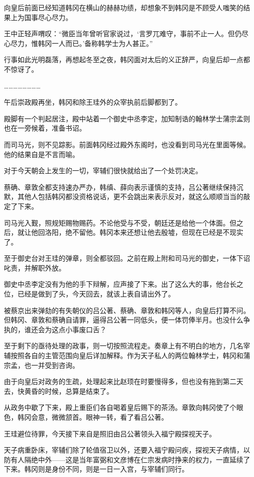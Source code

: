 向皇后前面已经知道韩冈在横山的赫赫功绩，却想象不到韩冈是不顾受人嗤笑的结果上为国事尽心尽力。 

王中正轻声喟叹：“微臣当年曾听官家说过，‘言罗兀难守，事前不止一人。但仍尽心尽力，惟韩冈一人而已。’备称韩学士为人甚正。” 

行事如此光明磊落，再想起冬至之夜，韩冈面对太后的义正辞严，向皇后却一点都不惊讶了。 

…………………… 

午后崇政殿再坐，韩冈和除王珪外的众宰执前后脚都到了。 

殿脚有一个判起居注，殿中站着一个御史中丞李定，加知制诰的翰林学士蒲宗孟则也在一旁候着，准备书诏。 

而司马光，则不见踪影。前面韩冈经过殿外东阁时，也没看到司马光在里面等候。他的结果自是不言而喻。 

对于今天朝会上发生的一切，宰辅们很快就给出了一个处罚决定。 

蔡确、章敦全都支持速办严办，韩缜、薛向表示谨慎的支持，吕公著继续保持沉默，其他人包括韩冈都没资格说话，更不会跳出来表示反对，就这么顺顺当当的敲定了下来。 

司马光入觐，照规矩赐物赐药。不论他受与不受，朝廷还是给他一个体面。但之后，就让他回洛阳，绝不留他。韩冈本来还想让他去殷墟，但现在已经是不现实了。 

至于御史台对王珪的弹章，则全都驳回。之前在殿上附和司马光的御史，一体下诏叱责，并解职外放。 

御史中丞李定没有为他的手下辩解，应声接了下来。出了这么大的事，他台长之位，已经是做到了头，今天回去，就该上表自请出外了。 

被蔡京出来弹劾的有失朝仪的吕公著、蔡确、章敦和韩冈等人，向皇后打算不问。但韩冈、章敦和蔡确自请罪，逼得吕公著一同低头，便一体罚俸半月。也没什么争执的，谁还会为这点小事废口舌？ 

至于剩下的亟待处理的政事，则一切按照流程走。奏章上有不明白的地方，几名宰辅按照各自的主管范围向皇后详加解释。作为天子私人的两位翰林学士，韩冈和蒲宗孟，也一并受到咨询。 

由于向皇后对政务的生疏，处理起来比赵顼在时要慢得多，但也没有拖到第二天去，快黄昏的时候，总算是结束了。 

从政务中歇了下来，殿上重臣们各自喝着皇后赐下的茶汤。章敦向韩冈使了个眼色，韩冈会意，微微颔首。眼神一转，看了看吕公著。 

王珪避位待罪，今天接下来自是照旧由吕公著领头入福宁殿探视天子。 

天子病重卧床，宰辅们除了轮值宿卫以外，还要入福宁殿问疾，探视天子病情，以防有人隔绝中外——这是当年富弼和文彦博在仁宗发病时挣来的权力，一直延续了下来。韩冈则是身份不同，则是一日一入宫，与宰辅们同行。 

